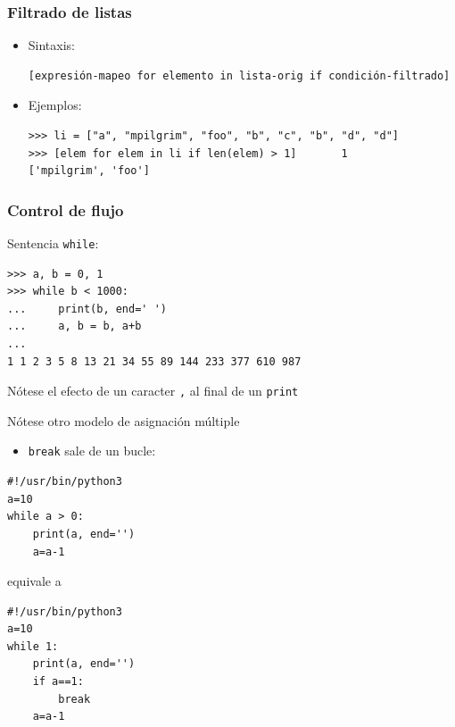 \documentclass{beamer}
\begin{document}
\begin{frame}[fragile]
\frametitle{Filtrado de listas}
\begin{itemize}
\item Sintaxis:
\begin{footnotesize}
\begin{verbatim}
[expresión-mapeo for elemento in lista-orig if condición-filtrado]
\end{verbatim}
\end{footnotesize}
\item Ejemplos:
\begin{footnotesize}
\begin{verbatim}
>>> li = ["a", "mpilgrim", "foo", "b", "c", "b", "d", "d"]
>>> [elem for elem in li if len(elem) > 1]       1
['mpilgrim', 'foo']
\end{verbatim}
\end{footnotesize}

\end{itemize}
 
\end{frame}








\begin{frame}[fragile]
 
\frametitle{Control de flujo}
Sentencia \verb|while|:
\begin{footnotesize}
\begin{verbatim}
>>> a, b = 0, 1
>>> while b < 1000:
...     print(b, end=' ')
...     a, b = b, a+b
... 
1 1 2 3 5 8 13 21 34 55 89 144 233 377 610 987
\end{verbatim}
\end{footnotesize}
Nótese el efecto de un caracter \verb|,| al final de un \verb|print|

Nótese otro modelo de asignación múltiple 

\end{frame}


\begin{frame}[fragile]

\begin{itemize}
  
\item 
\verb|break| sale de un bucle:
\end{itemize}

\begin{footnotesize}
\begin{verbatim}
#!/usr/bin/python3
a=10
while a > 0:
    print(a, end='')
    a=a-1

\end{verbatim}
\end{footnotesize}

equivale a 

\begin{footnotesize}
\begin{verbatim}
#!/usr/bin/python3
a=10
while 1:
    print(a, end='')
    if a==1:
        break
    a=a-1
\end{verbatim}
\end{footnotesize}
\end{frame}
\end{document}
